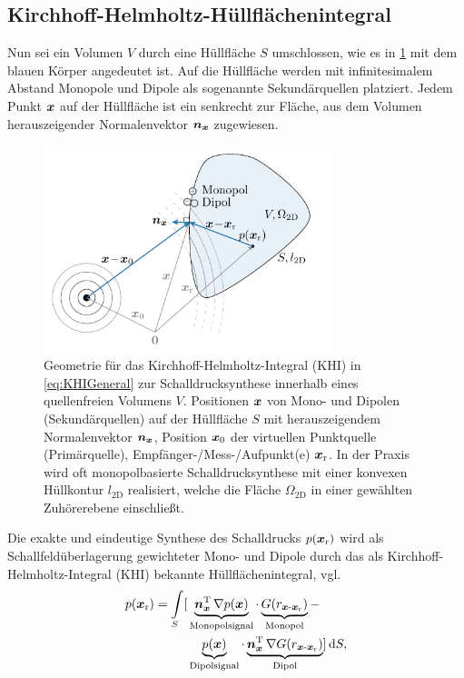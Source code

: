 \subsection{Kirchhoff-Helmholtz-Hüllflächenintegral}
%
Nun sei ein Volumen $V$ durch eine Hüllfläche $S$ umschlossen, wie es
in \Abb\ref{fig:KHIGeometrie} mit dem blauen Körper angedeutet ist.
%
Auf die Hüllfläche werden mit infinitesimalem Abstand
Monopole und Dipole als sogenannte Sekundärquellen
platziert.
%
Jedem Punkt $\bm{x}$ auf der Hüllfläche ist ein senkrecht zur Fläche,
aus dem Volumen herauszeigender Normalenvektor $\bm{n}_{\bm{x}}$ zugewiesen.
%
\begin{figure}[t]
\centering
\begin{plotfigures}
\includegraphics[width=85mm]{../graphics_DEU/khi_geometry.pdf}
\end{plotfigures}
\caption{Geometrie für das Kirchhoff-Helmholtz-Integral (KHI)
in \Glg\eqref{eq:KHIGeneral} zur
Schalldrucksynthese innerhalb eines quellenfreien Volumens $V$.
%
Positionen $\bm{x}$ von Mono- und Dipolen (Sekundärquellen) auf der Hüllfläche
$S$ mit herauszeigendem Normalenvektor $\bm{n}_{\bm{x}}$,
%
Position $\bm{x}_\mathrm{0}$ der virtuellen Punktquelle (Primärquelle),
%
Empfänger-/Mess-/Aufpunkt(e) $\bm{x}_\mathrm{r}$.
%
In der Praxis wird oft monopolbasierte Schalldrucksynthese mit einer konvexen
Hüllkontur $l_\text{2D}$ realisiert, welche die Fläche $\Omega_\text{2D}$ in einer
gewählten Zuhörerebene einschließt.
%
\cc
}
\label{fig:KHIGeometrie}
\end{figure}
%
Die exakte und eindeutige Synthese des Schalldrucks $p(\bm{x}_\mathrm{r})$ wird als
Schallfeldüberlagerung gewichteter Mono- und Dipole durch das
als Kirchhoff-Helmholtz-Integral (KHI)
bekannte Hüllflächenintegral, vgl. \cite[Kap.~23.2]{Skudrzyk1971}
%
\begin{align} %
\label{eq:KHIGeneral}
p(\xr) = \int\limits_S
[
&\underbrace{\nxT \, \nabla p(\xs)}_{\text{Monopolsignal}}\cdot
\underbrace{G(r_{\xs\text{-}\xr})}_{\text{Monopol}}
-\nonumber\\
&\underbrace{p(\xs)}_{\text{Dipolsignal}} \cdot
\underbrace{\nxT \, \nabla G(r_{\xs\text{-}\xr})}_{\text{Dipol}}
]
\,\mathrm{d}S,
\end{align}
